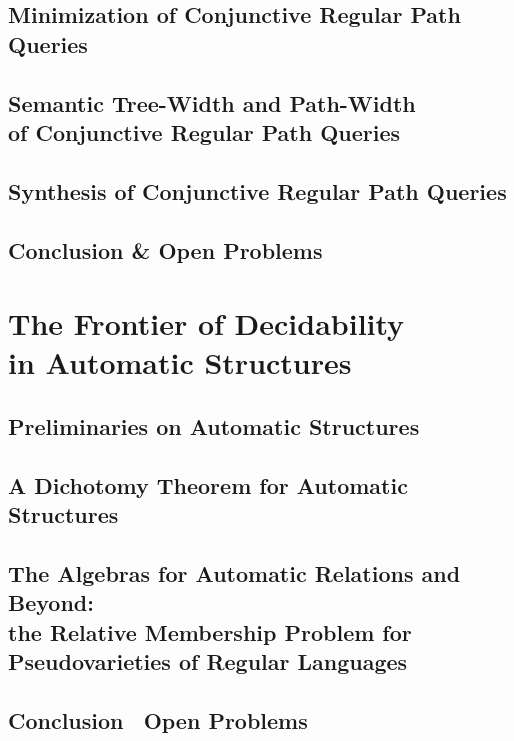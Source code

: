\documentclass[a4paper,sfsidenotes,twoside,justified]{tufte-book-custom}
\begin{document}
\chapter{Minimization of Conjunctive Regular Path Queries}

\chapter[{Semantic Tree-Width and Path-Width of Conjunctive Regular Path Queries}]{Semantic Tree-Width and Path-Width\\of Conjunctive Regular Path Queries}

\chapter{Synthesis of Conjunctive Regular Path Queries}

\chapter{Conclusion \& Open Problems}

\part[The Frontier of Decidability in Automatic Structures]{The Frontier of Decidability\\in Automatic Structures}

\chapter{Preliminaries on Automatic Structures}

\chapter{A Dichotomy Theorem for Automatic Structures}

\chapter{The Algebras for Automatic Relations and Beyond:\\the Relative Membership Problem for Pseudovarieties of Regular Languages}

\chapter{Conclusion \fancyand~Open Problems}


\backmatter



\end{document}
